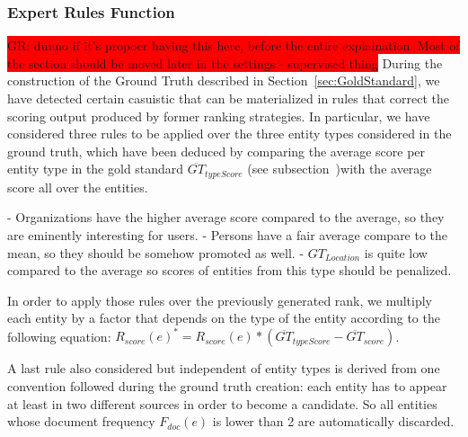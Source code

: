 \documentclass{llncs}
\newcommand{\todo}[1]{\colorbox{red}{#1}}
\begin{document}
\subsubsection{Expert Rules Function}
\todo{GR: dunno if it's propoer having this here, before the entire explaination. Most of the section should be moved later in the settings - supervised thing}
During the construction of the Ground Truth described in Section~\ref{sec:GoldStandard}, we have detected certain casuistic that can be materialized in rules that correct the scoring output produced by former ranking strategies. In particular, we have considered three rules to be applied over the three entity types considered in the ground truth, which have been deduced by comparing the average score per entity type in the gold standard $\overline{GT}_{typeScore}$ (see subsection~\label{sec:LessonsLearned})with the average score all over the entities.

- Organizations have the higher average score compared to the average, so they are eminently interesting for users.
- Persons have a fair average compare to the mean, so they should be somehow promoted as well.
- $GT_{Location}$ is quite low compared to the average so scores of entities from this type should be penalized.

In order to apply those rules over the previously generated rank, we multiply each entity by a factor that depends on the type of the entity according to the following equation: $R_{score}\left ( e \right )^{*} =  R_{score}\left ( e \right ) * (\overline{GT}_{typeScore} - \overline{GT}_{score})$.

A last rule also considered but independent of entity types is derived from one convention followed during the ground truth creation: each entity has to appear at least in two different sources in order to become a candidate. So all entities whose document frequency $F_{doc}(e)$ is lower than 2 are automatically discarded.

\end{document}
